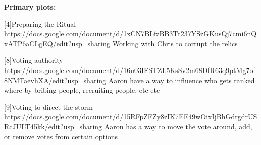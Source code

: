 \documentclass[char]{GL2020}
\begin{document}
\name{\cChupLeader{}}









\textbf{Primary plots:}

[4]Preparing the Ritual https://docs.google.com/document/d/1xCN7BLfzBB3Tt237YSzGKusQj7cmi6nQxATP6aCLgEQ/edit?usp=sharing
Working with Chris to corrupt the relics

[8]Voting authority https://docs.google.com/document/d/16u03IFSTZL5KsSv2m68DfR63q9ptMg7of8NMTaevhXA/edit?usp=sharing
Aaron have a way to influence who gets ranked where by bribing people, recruiting people, etc etc

[9]Voting to direct the storm https://docs.google.com/document/d/15RFpZFZy8zIK7EE49wOixIjBhGdrgdrUSRcJULT45kk/edit?usp=sharing
Aaron has a way to move the vote around, add, or remove votes from certain options
\end{document}
